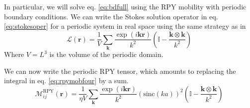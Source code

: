 \documentclass[ twoside,openright,titlepage,numbers=noenddot,%
headinclude,footinclude,cleardoublepage=empty,abstract=on,
BCOR=5mm,paper=a4,fontsize=11pt, dvipsnames
]{scrreprt}
\renewcommand{\vec}[1]{\bm{#1}}
\newcommand{\tens}[1]{\bm{\mathcal{#1}}}
\newcommand{\oper}[1]{\mathcal{#1}}
\newcommand{\sinc}{\textrm{sinc}}
\newcommand{\fpos}{r}
\begin{document}
In particular, we will solve eq. \eqref{eq:bdfull} using the \gls{RPY} mobility with periodic boundary conditions. We can write the Stokes solution operator in eq. \eqref{eq:stokesoper} for a periodic system in real space using the same strategy as in\cite{Hasimoto1959}
\begin{equation}
  \label{eq:psestokesoper}
  \oper{L}(\vec{\fpos}) = \frac{1}{V}\sum_{\vec{k}} \frac{\exp(i\vec{k}\vec{r})}{k^2}\left(\mathbb{I} - \frac{\vec{k}\otimes\vec{k}}{k^2}\right)
\end{equation}
Where $V = L^3$ is the volume of the periodic domain.

We can now write the periodic \gls{RPY} tensor, which amounts to replacing the integral in eq. \eqref{eq:rpymobfour} by a sum.
\begin{equation}
  \label{eq:pserpyfou}
  \tens{M}_{ij}^{\textrm{RPY}}(\vec{r})= \frac{1}{\eta V} \sum_{\vec{k}} \frac{\exp(i\vec{k}\vec{r})}{k^2}\left(\sinc(ka) \right)^2\left(\mathbb{I} - \frac{\vec{k}\otimes\vec{k}}{k^2}\right)
\end{equation}
\end{document}
